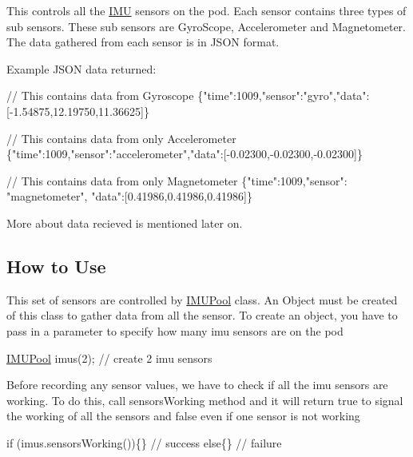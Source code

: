 This controls all the \hyperlink{class_i_m_u}{I\+MU} sensors on the pod. Each sensor contains three types of sub sensors. These sub sensors are {\ttfamily Gyro\+Scope}, {\ttfamily Accelerometer} and {\ttfamily Magnetometer}. The data gathered from each sensor is in J\+S\+ON format.

Example J\+S\+ON data returned\+:


\begin{DoxyCode}
\textcolor{comment}{// This contains data from Gyroscope}
\{\textcolor{stringliteral}{"time"}:1009,\textcolor{stringliteral}{"sensor"}:\textcolor{stringliteral}{"gyro"},\textcolor{stringliteral}{"data"}:[-1.54875,12.19750,11.36625]\}

\textcolor{comment}{// This contains data from only Accelerometer}
\{\textcolor{stringliteral}{"time"}:1009,\textcolor{stringliteral}{"sensor"}:\textcolor{stringliteral}{"accelerometer"},\textcolor{stringliteral}{"data"}:[-0.02300,-0.02300,-0.02300]\}

\textcolor{comment}{// This contains data from only Magnetometer}
\{\textcolor{stringliteral}{"time"}:1009,\textcolor{stringliteral}{"sensor"}: \textcolor{stringliteral}{"magnetometer"}, \textcolor{stringliteral}{"data"}:[0.41986,0.41986,0.41986]\}
\end{DoxyCode}


More about data recieved is mentioned later on.

\subsection*{How to Use}

This set of sensors are controlled by {\ttfamily \hyperlink{class_i_m_u_pool}{I\+M\+U\+Pool}} class. An Object must be created of this class to gather data from all the sensor. To create an object, you have to pass in a parameter to specify how many imu sensors are on the pod


\begin{DoxyCode}
\hyperlink{class_i_m_u_pool}{IMUPool} imus(2);            \textcolor{comment}{// create 2 imu sensors}
\end{DoxyCode}


Before recording any sensor values, we have to check if all the imu sensors are working. To do this, call {\ttfamily sensors\+Working} method and it will return true to signal the working of all the sensors and false even if one sensor is not working


\begin{DoxyCode}
\textcolor{keywordflow}{if} (imus.sensorsWorking())\{\}    \textcolor{comment}{// success}
\textcolor{keywordflow}{else}\{\}                          \textcolor{comment}{// failure}
\end{DoxyCode}


